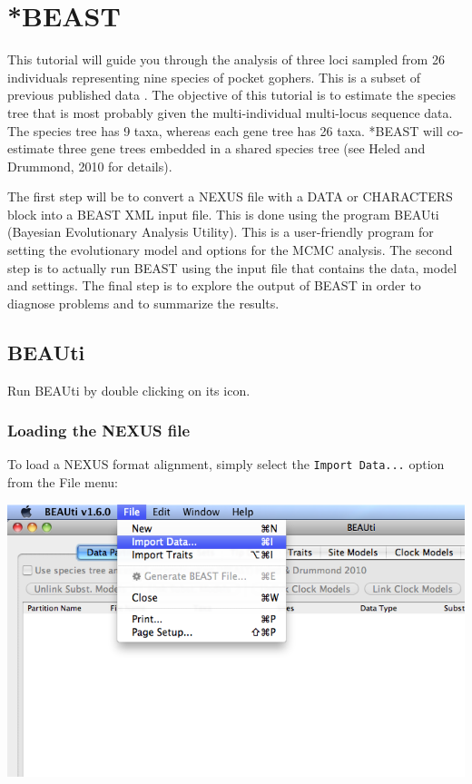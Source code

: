\documentclass[12pt]{article}
\begin{document}

\section*{*BEAST}

This tutorial will guide you through the analysis of three loci sampled from 26 individuals representing nine species of pocket gophers. This is a subset of previous published data \cite{belfiore2008multilocus}. The objective of this tutorial is to estimate the species tree that is most probably given the multi-individual multi-locus sequence data. The species tree has 9 taxa, whereas each gene tree has 26 taxa. *BEAST will co-estimate three gene trees embedded in a shared species tree (see Heled and Drummond, 2010 for details).

The first step will be to convert a NEXUS file with a DATA or CHARACTERS block into a BEAST XML input file. This is done using the program BEAUti (Bayesian Evolutionary Analysis Utility). This is a user-friendly program for setting the evolutionary model and options for the MCMC analysis. The second step is to actually run BEAST using the input file that contains the data, model and settings. The final step is to explore the output of BEAST in order to diagnose problems and to summarize the results.

\subsection*{BEAUti}

Run BEAUti by double clicking on its icon. 

\subsubsection*{Loading the NEXUS file }

To load a NEXUS format alignment, simply select the \texttt{Import
Data...} option from the File menu: 

\medskip{}

\includegraphics[scale=0.5]{figures/ImportNexus}
\end{document}
